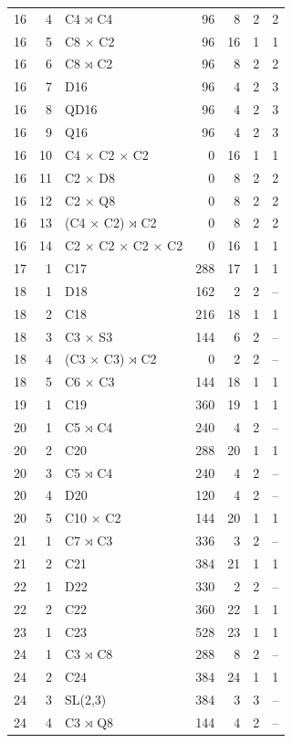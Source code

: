 {\begin{longtable}{rrlrrrr}
16 & 4 & C4 $\rtimes$ C4 & 96 & 8 & 2 & 2\\
16 & 5 & C8 $\times$ C2 & 96 & 16 & 1 & 1\\
16 & 6 & C8 $\rtimes$ C2 & 96 & 8 & 2 & 2\\
16 & 7 & D16 & 96 & 4 & 2 & 3\\
16 & 8 & QD16 & 96 & 4 & 2 & 3\\
16 & 9 & Q16 & 96 & 4 & 2 & 3\\
16 & 10 & C4 $\times$ C2 $\times$ C2 & 0 & 16 & 1 & 1\\
16 & 11 & C2 $\times$ D8 & 0 & 8 & 2 & 2\\
16 & 12 & C2 $\times$ Q8 & 0 & 8 & 2 & 2\\
16 & 13 & (C4 $\times$ C2) $\rtimes$ C2 & 0 & 8 & 2 & 2\\
16 & 14 & C2 $\times$ C2 $\times$ C2 $\times$ C2 & 0 & 16 & 1 & 1\\
17 & 1 & C17 & 288 & 17 & 1 & 1\\
18 & 1 & D18 & 162 & 2 & 2 & --\\
18 & 2 & C18 & 216 & 18 & 1 & 1\\
18 & 3 & C3 $\times$ S3 & 144 & 6 & 2 & --\\
18 & 4 & (C3 $\times$ C3) $\rtimes$ C2 & 0 & 2 & 2 & --\\
18 & 5 & C6 $\times$ C3 & 144 & 18 & 1 & 1\\
19 & 1 & C19 & 360 & 19 & 1 & 1\\
20 & 1 & C5 $\rtimes$ C4 & 240 & 4 & 2 & --\\
20 & 2 & C20 & 288 & 20 & 1 & 1\\
20 & 3 & C5 $\rtimes$ C4 & 240 & 4 & 2 & --\\
20 & 4 & D20 & 120 & 4 & 2 & --\\
20 & 5 & C10 $\times$ C2 & 144 & 20 & 1 & 1\\
21 & 1 & C7 $\rtimes$ C3 & 336 & 3 & 2 & --\\
21 & 2 & C21 & 384 & 21 & 1 & 1\\
22 & 1 & D22 & 330 & 2 & 2 & --\\
22 & 2 & C22 & 360 & 22 & 1 & 1\\
23 & 1 & C23 & 528 & 23 & 1 & 1\\
24 & 1 & C3 $\rtimes$ C8 & 288 & 8 & 2 & --\\
24 & 2 & C24 & 384 & 24 & 1 & 1\\
24 & 3 & SL(2,3) & 384 & 3 & 3 & --\\
24 & 4 & C3 $\rtimes$ Q8 & 144 & 4 & 2 & --\\

\end{longtable}}
